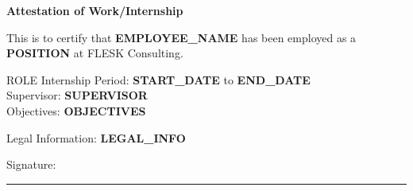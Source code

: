 \documentclass[a4paper,12pt]{article}
\def\Role{ROLE}
\begin{document}
\begin{center}
    \textbf{\Large Attestation of Work/Internship}
\end{center}

\vspace{1cm}

This is to certify that \textbf{EMPLOYEE_NAME} has been employed as a \textbf{POSITION} at FLESK Consulting.

\vspace{0.5cm}

\ifx\Role\stagiaire
Internship Period: \textbf{START_DATE} to \textbf{END_DATE} \\
Supervisor: \textbf{SUPERVISOR} \\
Objectives: \textbf{OBJECTIVES} \\
\fi

\vspace{0.5cm}

Legal Information: \textbf{LEGAL_INFO}

\vspace{1cm}

\begin{flushright}
    Signature: \rule{5cm}{0.4pt}
\end{flushright}
\end{document}
